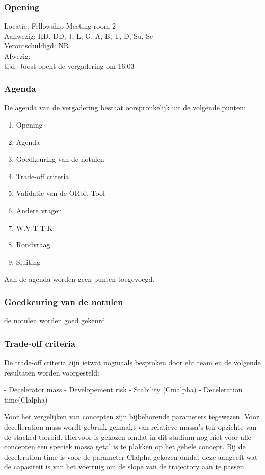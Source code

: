 \subsubsection{Opening}
Locatie: Fellowship Meeting room 2\\
Aanwezig: HD, DD, J, L, G, A, B, T, D, Su, Se\\
Verontschuldigd: NR \\
Afwezig: - \\
tijd: Joost opent de vergadering om 16:03\\

\subsubsection{Agenda}
De agenda van de vergadering bestaat oorspronkelijk uit de volgende punten:
\begin{enumerate}
\item Opening
\item Agenda
\item Goedkeuring van de notulen
\item Trade-off criteria
\item Validatie van de ORbit Tool
\item Andere vragen
\item W.V.T.T.K.
\item Rondvraag
\item Sluiting
\end{enumerate}

Aan de agenda worden geen punten toegevoegd.

\subsubsection{Goedkeuring van de notulen}
de notulen worden goed gekeurd

\subsubsection{Trade-off criteria}
De trade-off criteria zijn ietwat nogmaals besproken door eht team en de volgende resultaten worden voorgesteld:

- Decelerator mass
- Developement risk
- Stability (Cmalpha)
- Deceleration time(Clalpha)

Voor het vergelijken van concepten zijn bijbehorende parameters tegewezen. Voor decelleration mass wordt gebruik gemaakt van relatieve massa's ten opzichte van de stacked torroid. Hiervoor is gekozen omdat in dit stadium nog niet voor alle concepten een speciek massa getal is te plakken op het gehele concept.  Bij de deceleration time is voor de parameter  Clalpha gekozen omdat deze aangeeft wat de capasiteit is van het voertuig om de slope van de trajectory aan te passen. \\

